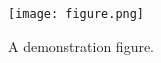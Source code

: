 \begin{figure}[htb!]
    \centering
    \texttt{[image: figure.png]}
    \caption{A demonstration figure.}
    \label{fig:demo}
\end{figure}
